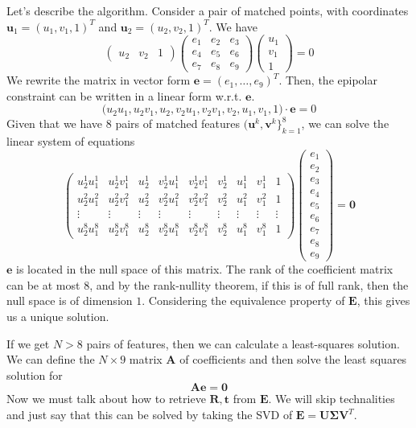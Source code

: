 \documentclass{article}
\theoremstyle{definition}
\theoremstyle{remark}
\theoremstyle{definition}
\begin{document}
Let's describe the algorithm. Consider a pair of matched points, with coordinates $\mathbf{u}_1 = (u_1, v_1, 1)^T$ and $\mathbf{u}_2 = (u_2, v_2, 1)^T$. We have 
\[\begin{pmatrix} u_2 & v_2 & 1 \end{pmatrix} \begin{pmatrix} e_1 & e_2 & e_3 \\ e_4 & e_5 & e_6 \\ e_7 & e_8 & e_9 \end{pmatrix} \begin{pmatrix} u_1 \\ v_1 \\ 1 \end{pmatrix} = 0\]
We rewrite the matrix in vector form $\mathbf{e} = (e_1, \ldots, e_9)^T$. Then, the epipolar constraint can be written in a linear form w.r.t. $\mathbf{e}$. 
\[\big( u_2 u_1 , u_2 v_1 , u_2 , v_2 u_1, v_2 v_1, v_2, u_1, v_1, 1 \big) \cdot \mathbf{e} = 0\]
Given that we have $8$ pairs of matched features $(\mathbf{u}^k, \mathbf{v}^k\}_{k=1}^8$, we can solve the linear system of equations
\[\begin{pmatrix} 
u_2^1 u_1^1 & u_2^1 v_1^1 & u_2^1 & v_2^1 u_1^1 & v_2^1 v_1^1 & v_2^1 & u_1^1 & v_1^1 & 1 \\
u_2^2 u_1^2 & u_2^2 v_1^2 & u_2^2 & v_2^2 u_1^2 & v_2^2 v_1^2 & v_2^2 & u_1^2 & v_1^2 & 1 \\
\vdots & \vdots & \vdots & \vdots & \vdots & \vdots & \vdots & \vdots & \vdots \\
u_2^8 u_1^8 & u_2^8 v_1^8 & u_2^8 & v_2^8 u_1^8 & v_2^8 v_1^8 & v_2^8 & u_1^8 & v_1^8 & 1 \end{pmatrix} \begin{pmatrix} e_1 \\ e_2 \\ e_3 \\ e_4 \\ e_5 \\ e_6 \\ e_7 \\ e_8 \\ e_9 \end{pmatrix} = \mathbf{0}\]
$\mathbf{e}$ is located in the null space of this matrix. The rank of the coefficient matrix can be at most $8$, and by the rank-nullity theorem, if this is of full rank, then the null space is of dimension $1$. Considering the equivalence property of $\mathbf{E}$, this gives us a unique solution. 

If we get $N > 8$ pairs of features, then we can calculate a least-squares solution. We can define the $N \times 9$ matrix $\mathbf{A}$ of coefficients and then solve the least squares solution for 
\[\mathbf{A} \mathbf{e} = \mathbf{0}\]
Now we must talk about how to retrieve $\mathbf{R}, \mathbf{t}$ from $\mathbf{E}$. We will skip technalities and just say that this can be solved by taking the SVD of $\mathbf{E} = \mathbf{U} \mathbf{\Sigma} \mathbf{V}^T$. 
\end{document}
